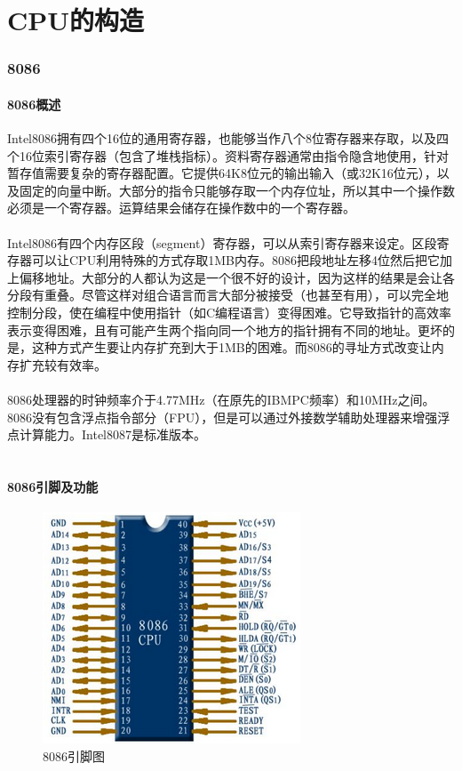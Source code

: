 \documentclass[12pt]{article}
\begin{document}
\part{CPU的构造}
\section{8086}
\subsection{8086概述}
Intel8086拥有四个16位的通用寄存器，也能够当作八个8位寄存器来存取，以及四个16位索引寄存器（包含了堆栈指标）。资料寄存器通常由指令隐含地使用，针对暂存值需要复杂的寄存器配置。它提供64K8位元的输出输入（或32K16位元），以及固定的向量中断。大部分的指令只能够存取一个内存位址，所以其中一个操作数必须是一个寄存器。运算结果会储存在操作数中的一个寄存器。\\\\
Intel8086有四个内存区段（segment）寄存器，可以从索引寄存器来设定。区段寄存器可以让CPU利用特殊的方式存取1MB内存。8086把段地址左移4位然后把它加上偏移地址。大部分的人都认为这是一个很不好的设计，因为这样的结果是会让各分段有重叠。尽管这样对组合语言而言大部分被接受（也甚至有用），可以完全地控制分段，使在编程中使用指针（如C编程语言）变得困难。它导致指针的高效率表示变得困难，且有可能产生两个指向同一个地方的指针拥有不同的地址。更坏的是，这种方式产生要让内存扩充到大于1MB的困难。而8086的寻址方式改变让内存扩充较有效率。\\\\
8086处理器的时钟频率介于4.77MHz（在原先的IBMPC频率）和10MHz之间。8086没有包含浮点指令部分（FPU），但是可以通过外接数学辅助处理器来增强浮点计算能力。Intel8087是标准版本。\\\\
\subsection{8086引脚及功能}
\begin{figure}[htbp]
\centering
\includegraphics[scale=0.7]{fig/13.png}
\caption{8086引脚图}
\label{fig:Intel CPU 8086}
\end{figure}
\end{document}
